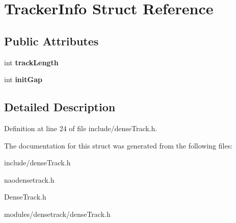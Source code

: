 \hypertarget{struct_tracker_info}{
\section{TrackerInfo Struct Reference}
\label{struct_tracker_info}
}
\subsection*{Public Attributes}
\begin{DoxyCompactItemize}
\item 
\hypertarget{struct_tracker_info_aeec8c64dbf3a9b538ae79b58db65b910}{
int {\bfseries trackLength}}
\label{struct_tracker_info_aeec8c64dbf3a9b538ae79b58db65b910}

\item 
\hypertarget{struct_tracker_info_af059c4a2f15492344586f6e11a57f2b6}{
int {\bfseries initGap}}
\label{struct_tracker_info_af059c4a2f15492344586f6e11a57f2b6}

\end{DoxyCompactItemize}


\subsection{Detailed Description}


Definition at line 24 of file include/denseTrack.h.



The documentation for this struct was generated from the following files:\begin{DoxyCompactItemize}
\item 
include/denseTrack.h\item 
naodensetrack.h\item 
DenseTrack.h\item 
modules/densetrack/denseTrack.h\end{DoxyCompactItemize}
